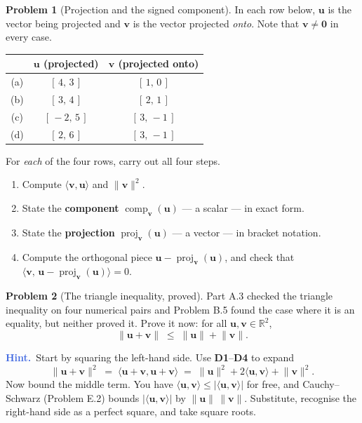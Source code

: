 \documentclass[11pt]{article}
\theoremstyle{definition}
\newtheorem{prob}{Problem}[section]
\newcommand{\hint}[1]{\par\smallskip\noindent
  {\small\sffamily\textcolor{RoyalBlue}{\textbf{Hint.}}\ #1}\par\smallskip}
\newcommand{\R}{\mathbb{R}}
\newcommand{\vc}[1]{\mathbf{#1}}
\newcommand{\norm}[1]{\lVert #1\rVert}
\newcommand{\ip}[2]{\langle #1,#2\rangle}
\newcommand{\proj}[2]{\operatorname{proj}_{#1}(#2)}
\newcommand{\comp}[2]{\operatorname{comp}_{#1}(#2)}
\begin{document}
\begin{prob}[Projection and the signed component]
In each row below, $\vc{u}$ is the vector being projected and $\vc{v}$ is the
vector projected \emph{onto}. Note that $\vc{v}\neq\vc{0}$ in every case.

\begin{center}
\renewcommand{\arraystretch}{1.2}
\begin{tabular}{@{}c c c@{}}
\toprule
 & $\vc{u}$ (projected) & $\vc{v}$ (projected onto) \\
\midrule
(a) & $[\,4,\,3\,]$   & $[\,1,\,0\,]$   \\
(b) & $[\,3,\,4\,]$   & $[\,2,\,1\,]$   \\
(c) & $[\,-2,\,5\,]$  & $[\,3,\,-1\,]$  \\
(d) & $[\,2,\,6\,]$   & $[\,3,\,-1\,]$  \\
\bottomrule
\end{tabular}
\end{center}

\noindent For \emph{each} of the four rows, carry out all four steps.

\begin{enumerate}[label=\textbf{Step \arabic*.},leftmargin=4.8em,itemsep=6pt,topsep=6pt]
  \item Compute $\ip{\vc{v}}{\vc{u}}$ and $\norm{\vc{v}}^{2}$.
  \item State the \textbf{component} $\comp{\vc{v}}{\vc{u}}$ --- a scalar ---
        in exact form.
  \item State the \textbf{projection} $\proj{\vc{v}}{\vc{u}}$ --- a vector ---
        in bracket notation.
  \item Compute the orthogonal piece $\vc{u}-\proj{\vc{v}}{\vc{u}}$, and check
        that $\ip{\vc{v}}{\,\vc{u}-\proj{\vc{v}}{\vc{u}}}=0$.
\end{enumerate}
\end{prob}

\begin{prob}[The triangle inequality, proved]
Part A.3 checked the triangle inequality on four numerical pairs and Problem B.5
found the case where it is an equality, but neither proved it. Prove it now: for
all $\vc{u},\vc{v}\in\R^{2}$,
\[
  \norm{\vc{u}+\vc{v}} \;\le\; \norm{\vc{u}}+\norm{\vc{v}} .
\]

\hint{Start by squaring the left-hand side. Use \textbf{D1}--\textbf{D4} to
expand
\[
  \norm{\vc{u}+\vc{v}}^{2}
  \;=\; \ip{\vc{u}+\vc{v}}{\vc{u}+\vc{v}}
  \;=\; \norm{\vc{u}}^{2}+2\ip{\vc{u}}{\vc{v}}+\norm{\vc{v}}^{2} .
\]
Now bound the middle term. You have $\ip{\vc{u}}{\vc{v}}\le\lvert\ip{\vc{u}}{\vc{v}}\rvert$
for free, and Cauchy--Schwarz (Problem E.2) bounds
$\lvert\ip{\vc{u}}{\vc{v}}\rvert$ by $\norm{\vc{u}}\,\norm{\vc{v}}$. Substitute,
recognise the right-hand side as a perfect square, and take square roots.}
\end{prob}
\end{document}
